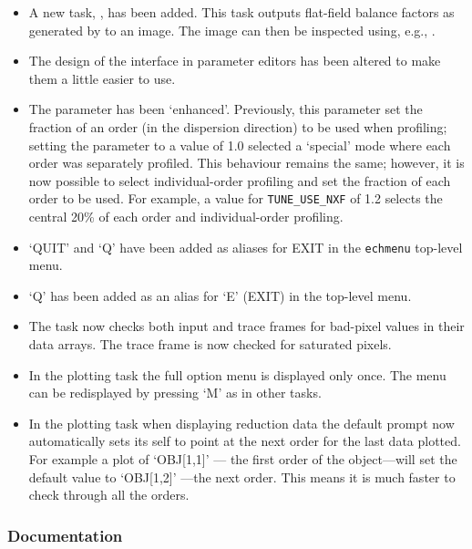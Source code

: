 \documentclass[twoside,11pt,nolof]{starlink}
\begin{document}
\begin{itemize}
 \item A new task, ,
   has been added.  This task outputs flat-field
   balance factors as generated by 
   to an image.  The image
   can then be inspected using, e.g., 
   .
\item The design of the interface in parameter editors has been altered
   to make them a little easier to use.
\item The parameter 
   has been `enhanced'.  Previously, this
   parameter set the fraction of an order (in the dispersion direction)
   to be used when profiling; setting the parameter to a value of 1.0
   selected a `special' mode where each order was separately profiled.
   This behaviour remains the same; however, it is now possible to
   select individual-order profiling and set the fraction of each order
   to be used.  For example, a value for {\tt TUNE\_USE\_NXF} of 1.2 selects
   the central 20\% of each order and individual-order profiling.
\item `QUIT' and `Q' have been added as aliases for EXIT in the \texttt{echmenu}
   top-level menu.
\item `Q' has been added as an alias for `E' (EXIT) in the
    top-level menu.
\item The task  now checks both
   input and trace frames for
   bad-pixel values in their data arrays.  The trace frame is now
   checked for saturated pixels.
\item In the plotting task the full option menu is displayed only once.
   The menu can be redisplayed by pressing `M' as in other tasks.
\item In the plotting task when displaying reduction data the default
   prompt now automatically sets its self to point at the next order
   for the last data plotted.  For example a plot of `OBJ[1,1]' --- the
   first order of the object---will set the default value to `OBJ[1,2]'
   ---the next order.  This means it is much faster to check through all
   the orders.
\end{itemize}

\subsubsection{Documentation}
\end{document}

